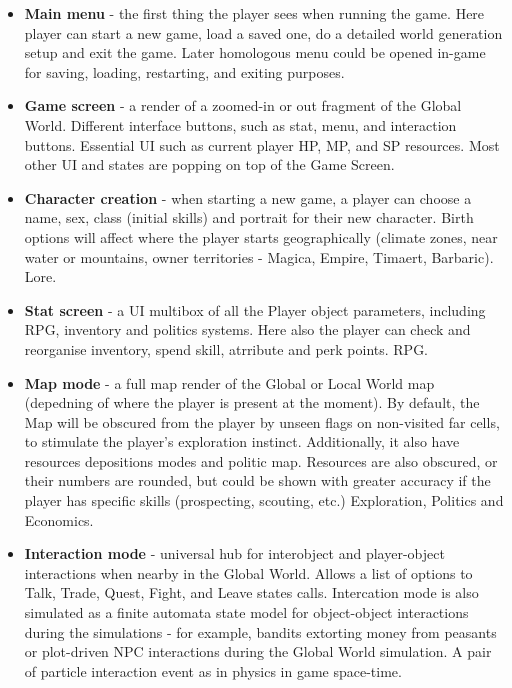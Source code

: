 \documentclass[a4paper,12pt]{article}
\begin{document}
 \begin{itemize}
 
 \item \textbf{Main menu} - the first thing the player sees when running the game. Here player can start a new game, load a saved one, do a detailed world generation setup and exit the game. Later homologous menu could be opened in-game for saving, loading, restarting, and exiting purposes.
 
 \item \textbf{Game screen} - a render of a zoomed-in or out fragment of the Global World. Different interface buttons, such as stat, menu, and interaction buttons. Essential UI such as current player HP, MP, and SP resources. Most other UI and states are popping on top of the Game Screen.
 
  \item \textbf{Character creation} - when starting a new game, a player can choose a name, sex, class (initial skills) and portrait for their new character. Birth options will affect where the player starts geographically (climate zones, near water or mountains, owner territories - Magica, Empire, Timaert, Barbaric). Lore.
 
 \item \textbf{Stat screen} - a UI multibox of all the Player object parameters, including RPG, inventory and politics systems. Here also the player can check and reorganise inventory, spend skill, atrribute and perk points. RPG.

 \item \textbf{Map mode} - a full map render of the Global or Local World map (depedning of where the player is present at the moment). By default, the Map will be obscured from the player by unseen flags on non-visited far cells, to stimulate the player's exploration instinct. Additionally, it also have resources depositions modes and politic map. Resources are also obscured, or their numbers are rounded, but could be shown with greater accuracy if the player has specific skills (prospecting, scouting, etc.) Exploration, Politics and Economics.
 
 \item \textbf{Interaction mode} - universal hub for interobject and player-object interactions when nearby in the Global World. Allows a list of options to Talk, Trade, Quest, Fight, and Leave states calls. Intercation mode is also simulated as a finite automata state model for object-object interactions during the simulations - for example, bandits extorting money from peasants or plot-driven NPC interactions during the Global World simulation. A pair of particle interaction event as in physics in game space-time.
  

\end{itemize}
\end{document}
